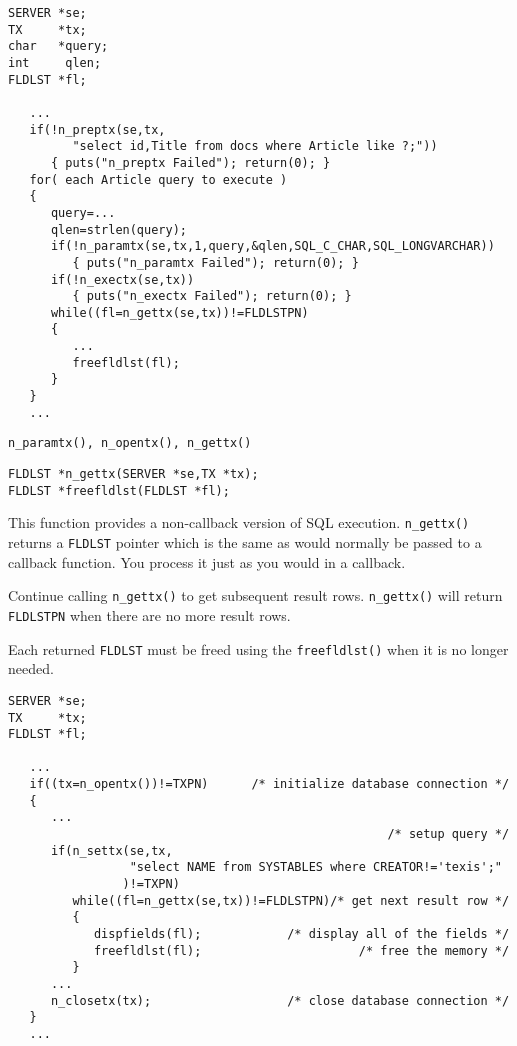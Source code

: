 \EXAMPLE
\begin{verbatim}
SERVER *se;
TX     *tx;
char   *query;
int     qlen;
FLDLST *fl;

   ...
   if(!n_preptx(se,tx,
         "select id,Title from docs where Article like ?;"))
      { puts("n_preptx Failed"); return(0); }
   for( each Article query to execute )
   {
      query=...
      qlen=strlen(query);
      if(!n_paramtx(se,tx,1,query,&qlen,SQL_C_CHAR,SQL_LONGVARCHAR))
         { puts("n_paramtx Failed"); return(0); }
      if(!n_exectx(se,tx))
         { puts("n_exectx Failed"); return(0); }
      while((fl=n_gettx(se,tx))!=FLDLSTPN)
      {
         ...
         freefldlst(fl);
      }
   }
   ...
\end{verbatim}

\SEE
\begin{verbatim}
n_paramtx(), n_opentx(), n_gettx()
\end{verbatim}


\SYNOPSIS
\begin{verbatim}
FLDLST *n_gettx(SERVER *se,TX *tx);
FLDLST *freefldlst(FLDLST *fl);
\end{verbatim}

\DESCRIPTION

This function provides a non-callback version of SQL execution.
\verb`n_gettx()` returns a \verb`FLDLST` pointer which is the
same as would normally be passed to a callback function. You process
it just as you would in a callback.

Continue calling \verb`n_gettx()` to get subsequent result rows.
\verb`n_gettx()` will return \verb`FLDLSTPN` when there are no more
result rows.

Each returned \verb`FLDLST` must be freed using the \verb`freefldlst()`
when it is no longer needed.

\EXAMPLE
\begin{verbatim}
SERVER *se;
TX     *tx;
FLDLST *fl;

   ...
   if((tx=n_opentx())!=TXPN)      /* initialize database connection */
   {
      ...
                                                     /* setup query */
      if(n_settx(se,tx,
                 "select NAME from SYSTABLES where CREATOR!='texis';"
                )!=TXPN)
         while((fl=n_gettx(se,tx))!=FLDLSTPN)/* get next result row */
         {
            dispfields(fl);            /* display all of the fields */
            freefldlst(fl);                      /* free the memory */
         }
      ...
      n_closetx(tx);                   /* close database connection */
   }
   ...
\end{verbatim}

